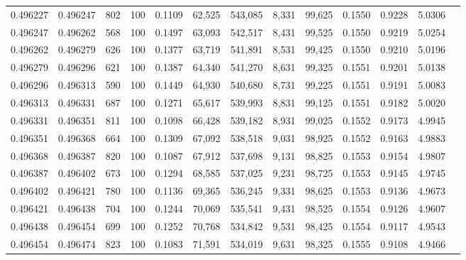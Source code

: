 \begin{tabular}{rrrrrrrrrrrrr}
0.496227 & 0.496247 &   802 & 100 &                                     0.1109 &  62,525 & 543,085 &   8,331 &  99,625 & 0.1550 & 0.9228 & 5.0306 \\
0.496247 & 0.496262 &   568 & 100 &                                     0.1497 &  63,093 & 542,517 &   8,431 &  99,525 & 0.1550 & 0.9219 & 5.0254 \\
0.496262 & 0.496279 &   626 & 100 &                                     0.1377 &  63,719 & 541,891 &   8,531 &  99,425 & 0.1550 & 0.9210 & 5.0196 \\
0.496279 & 0.496296 &   621 & 100 &                                     0.1387 &  64,340 & 541,270 &   8,631 &  99,325 & 0.1551 & 0.9201 & 5.0138 \\
0.496296 & 0.496313 &   590 & 100 &                                     0.1449 &  64,930 & 540,680 &   8,731 &  99,225 & 0.1551 & 0.9191 & 5.0083 \\
0.496313 & 0.496331 &   687 & 100 &                                     0.1271 &  65,617 & 539,993 &   8,831 &  99,125 & 0.1551 & 0.9182 & 5.0020 \\
0.496331 & 0.496351 &   811 & 100 &                                     0.1098 &  66,428 & 539,182 &   8,931 &  99,025 & 0.1552 & 0.9173 & 4.9945 \\
0.496351 & 0.496368 &   664 & 100 &                                     0.1309 &  67,092 & 538,518 &   9,031 &  98,925 & 0.1552 & 0.9163 & 4.9883 \\
0.496368 & 0.496387 &   820 & 100 &                                     0.1087 &  67,912 & 537,698 &   9,131 &  98,825 & 0.1553 & 0.9154 & 4.9807 \\
0.496387 & 0.496402 &   673 & 100 &                                     0.1294 &  68,585 & 537,025 &   9,231 &  98,725 & 0.1553 & 0.9145 & 4.9745 \\
0.496402 & 0.496421 &   780 & 100 &                                     0.1136 &  69,365 & 536,245 &   9,331 &  98,625 & 0.1553 & 0.9136 & 4.9673 \\
0.496421 & 0.496438 &   704 & 100 &                                     0.1244 &  70,069 & 535,541 &   9,431 &  98,525 & 0.1554 & 0.9126 & 4.9607 \\
0.496438 & 0.496454 &   699 & 100 &                                     0.1252 &  70,768 & 534,842 &   9,531 &  98,425 & 0.1554 & 0.9117 & 4.9543 \\
0.496454 & 0.496474 &   823 & 100 &                                     0.1083 &  71,591 & 534,019 &   9,631 &  98,325 & 0.1555 & 0.9108 & 4.9466 \\

\end{tabular}
